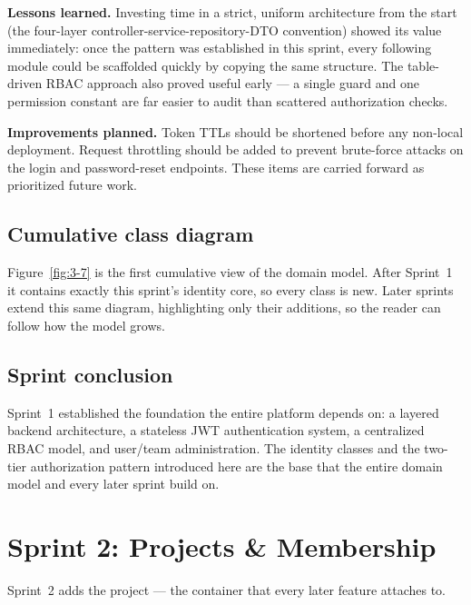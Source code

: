 \textbf{Lessons learned.} Investing time in a strict, uniform architecture from the start (the
four-layer controller-service-repository-DTO convention) showed its value immediately: once the
pattern was established in this sprint, every following module could be scaffolded quickly
by copying the same structure. The table-driven RBAC approach also proved useful early ---
a single guard and one permission constant are far easier to audit than scattered authorization
checks.

\textbf{Improvements planned.} Token TTLs should be shortened before any non-local deployment.
Request throttling should be added to prevent brute-force attacks on the login and
password-reset endpoints. These items are carried forward as prioritized future work.

\subsection{Cumulative class diagram}

Figure~\ref{fig:3-7} is the first cumulative view of the domain model. After Sprint~1 it
contains exactly this sprint's identity core, so every class is new. Later sprints extend this
same diagram, highlighting only their additions, so the reader can follow how the model grows.


\subsection{Sprint conclusion}

Sprint~1 established the foundation the entire platform depends on: a layered backend
architecture, a stateless JWT authentication system, a centralized RBAC model, and user/team
administration. The identity classes and the two-tier authorization pattern introduced here are
the base that the entire domain model and every later sprint build on.

\ifpartialbuild\else
\clearpage
\section{Sprint 2: Projects \& Membership}

Sprint~2 adds the project --- the container that every later feature attaches to.

